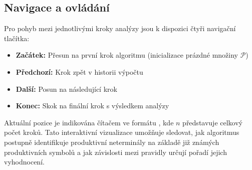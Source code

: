 \subsection{Navigace a ovládání}
\label{sec:GrammarsStepByStepNavigation}

Pro pohyb mezi jednotlivými kroky analýzy jsou k dispozici čtyři navigační tlačítka:

\begin{itemize}
    \item \textbf{Začátek:} Přesun na první krok algoritmu (inicializace prázdné množiny \( \mathcal{P} \))
    \item \textbf{Předchozí:} Krok zpět v historii výpočtu
    \item \textbf{Další:} Posun na následující krok
    \item \textbf{Konec:} Skok na finální krok s výsledkem analýzy
\end{itemize}

Aktuální pozice je indikována čítačem ve formátu , kde \( n \) představuje celkový počet kroků. Tato interaktivní vizualizace umožňuje sledovat, jak algoritmus postupně identifikuje produktivní neterminály na základě již známých produktivních symbolů a jak závislosti mezi pravidly určují pořadí jejich vyhodnocení.